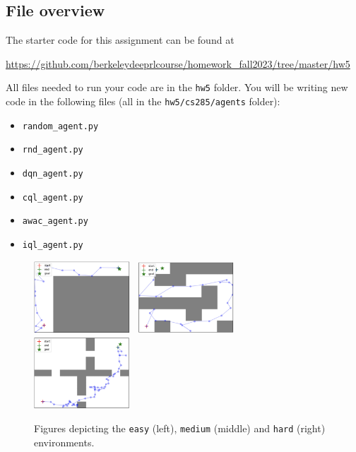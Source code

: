 \documentclass{article}
\begin{document}
\subsection{File overview}
The starter code for this assignment can be found at

\begin{centering}
\url{https://github.com/berkeleydeeprlcourse/homework_fall2023/tree/master/hw5} \\
\end{centering}
\vspace{.35cm}

All files needed to run your code are in the \texttt{hw5} folder. 
You will be writing new code in the following files (all in the \texttt{hw5/cs285/agents} folder):
\begin{itemize}
\item \texttt{random\_agent.py}
\item \texttt{rnd\_agent.py}
\item \texttt{dqn\_agent.py}
\item \texttt{cql\_agent.py}
\item \texttt{awac\_agent.py}
\item \texttt{iql\_agent.py}
\end{itemize}


\begin{figure}[h]
    \centering
    \includegraphics[width=0.32\textwidth]{easy.png}~
    \includegraphics[width=0.32\textwidth]{medium.png}~
    \includegraphics[width=0.32\textwidth]{hard.png}
    \vspace{-10pt}
    \caption{Figures depicting the \texttt{easy} (left), \texttt{medium} (middle) and \texttt{hard} (right) environments.}
    \vspace{-10pt}
\end{figure}
\end{document}
